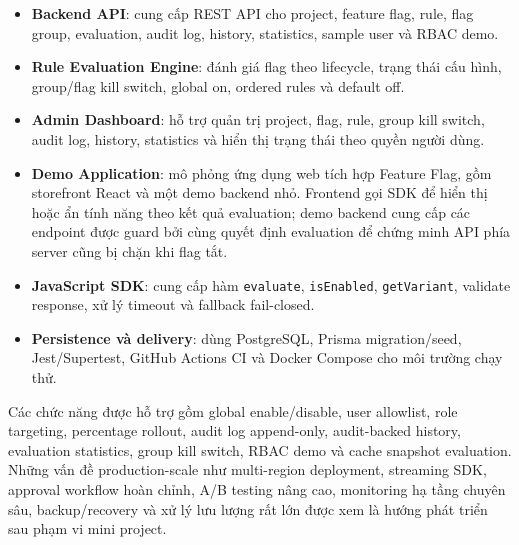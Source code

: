 \begin{itemize}
    \item \textbf{Backend API}: cung cấp REST API cho project, feature flag, rule, flag group, evaluation, audit log, history, statistics, sample user và RBAC demo.
    \item \textbf{Rule Evaluation Engine}: đánh giá flag theo lifecycle, trạng thái cấu hình, group/flag kill switch, global on, ordered rules và default off.
    \item \textbf{Admin Dashboard}: hỗ trợ quản trị project, flag, rule, group kill switch, audit log, history, statistics và hiển thị trạng thái theo quyền người dùng.
    \item \textbf{Demo Application}: mô phỏng ứng dụng web tích hợp Feature Flag, gồm storefront React và một demo backend nhỏ. Frontend gọi SDK để hiển thị hoặc ẩn tính năng theo kết quả evaluation; demo backend cung cấp các endpoint được guard bởi cùng quyết định evaluation để chứng minh API phía server cũng bị chặn khi flag tắt.
    \item \textbf{JavaScript SDK}: cung cấp hàm \texttt{evaluate}, \texttt{isEnabled}, \texttt{getVariant}, validate response, xử lý timeout và fallback fail-closed.
    \item \textbf{Persistence và delivery}: dùng PostgreSQL, Prisma migration/seed, Jest/Supertest, GitHub Actions CI và Docker Compose cho môi trường chạy thử.
\end{itemize}

Các chức năng được hỗ trợ gồm global enable/disable, user allowlist, role targeting, percentage rollout, audit log append-only, audit-backed history, evaluation statistics, group kill switch, RBAC demo và cache snapshot evaluation. Những vấn đề production-scale như multi-region deployment, streaming SDK, approval workflow hoàn chỉnh, A/B testing nâng cao, monitoring hạ tầng chuyên sâu, backup/recovery và xử lý lưu lượng rất lớn được xem là hướng phát triển sau phạm vi mini project.
